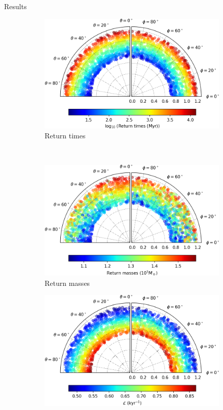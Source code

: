 \documentclass{beamer}
\begin{document}
\begin{frame}{Results}
	\begin{figure}[h]
		\centering
		\begin{subfigure}[t]{0.35\textwidth}
			\includegraphics[width = \textwidth]{"../Files/Week 13/images/10_time"}
			\caption{Return times}
		\end{subfigure}
		~ 
		\begin{subfigure}[t]{0.35\textwidth}
			\includegraphics[width=\textwidth]{"../Files/Week 13/images/10_mass"}
			\caption{Return masses}
		\end{subfigure}
		\begin{subfigure}[t]{0.35\textwidth}
			\includegraphics[width=\textwidth]{"../Files/Week 13/images/10_lyapunov"}

\end{subfigure}
\end{figure}
\end{frame}
\end{document}
